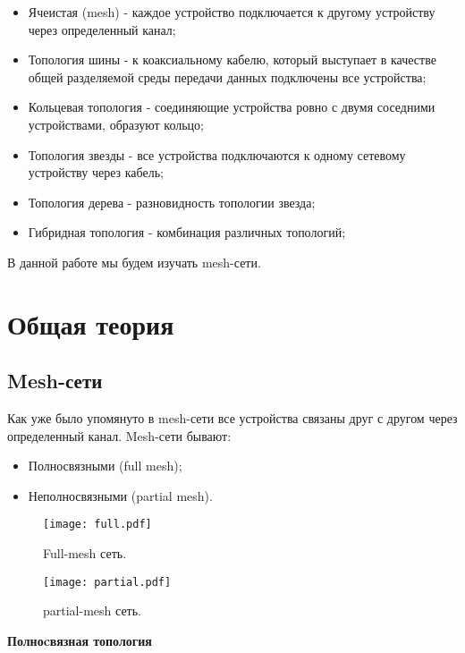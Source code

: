 \documentclass[a4paper]{article}
\begin{document}
\begin{itemize}
    \item Ячеистая (mesh) - каждое устройство подключается к другому устройству через определенный канал;
    \item Топология шины - к коаксиальному кабелю, который выступает в качестве общей разделяемой среды передачи данных подключены все устройства;
    \item Кольцевая топология - соединяющие устройства ровно с двумя соседними устройствами, образуют кольцо;
    \item Топология звезды - все устройства подключаются к одному сетевому устройству через кабель;
    \item Топология дерева - разновидность топологии звезда;
    \item Гибридная топология - комбинация различных топологий;
\end{itemize}
В данной работе мы будем изучать mesh-сети.
\section{Общая теория}

\subsection{Mesh-сети}
Как уже было упомянуто в mesh-сети все устройства связаны друг с другом через определенный канал.
Mesh-сети бывают: 
\begin{itemize}
    \item Полносвязными (full mesh);
    \item Неполносвязными (partial mesh).
\end{itemize}

\begin{figure}[H]
	\begin{center}
	\begin{minipage}[h]{0.45\linewidth}
	\texttt{[image: full.pdf]}
	\caption{Full-mesh сеть.} 
    \label{p2}
	\end{minipage}
	\hfill 
	\begin{minipage}[h]{0.43\linewidth}
	\texttt{[image: partial.pdf]}
	\caption{partial-mesh сеть.}
	\label{p3}
	\end{minipage}
	\end{center}
\end{figure}

\textbf{Полноcвязная топология} \par
\end{document}

